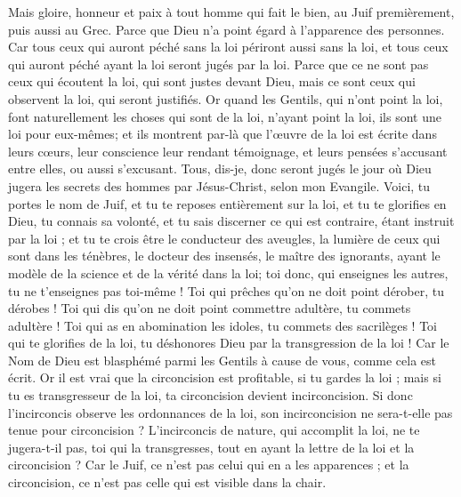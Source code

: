 \begin{multicols}{2}
Mais gloire, honneur et paix à tout homme qui fait le bien, au Juif premièrement, puis aussi au Grec.
Parce que Dieu n'a point égard à l'apparence des personnes.
Car tous ceux qui auront péché sans la loi périront aussi sans la loi, et tous ceux qui auront péché ayant la loi seront jugés par la loi.
Parce que ce ne sont pas ceux qui écoutent la loi, qui sont justes devant Dieu, mais ce sont ceux qui observent la loi, qui seront justifiés.
Or quand les Gentils, qui n'ont point la loi, font naturellement les choses qui sont de la loi, n'ayant point la loi, ils sont une loi pour eux-mêmes;
et ils montrent par-là que l'œuvre de la loi est écrite dans leurs cœurs, leur conscience leur rendant témoignage, et leurs pensées s'accusant entre elles, ou aussi s'excusant.
Tous, dis-je, donc seront jugés le jour où Dieu jugera les secrets des hommes par Jésus-Christ, selon mon Evangile.
Voici, tu portes le nom de Juif, et tu te reposes entièrement sur la loi, et tu te glorifies en Dieu,
tu connais sa volonté, et tu sais discerner ce qui est contraire, étant instruit par la loi ; 
et tu te crois être le conducteur des aveugles, la lumière de ceux qui sont dans les ténèbres,
le docteur des insensés, le maître des ignorants, ayant le modèle de la science et de la vérité dans la loi;
toi donc, qui enseignes les autres, tu ne t'enseignes pas toi-même ! Toi qui prêches qu'on ne doit point dérober, tu dérobes !
Toi qui dis qu'on ne doit point commettre adultère, tu commets adultère ! Toi qui as en abomination les idoles, tu commets des sacrilèges !
Toi qui te glorifies de la loi, tu déshonores Dieu par la transgression de la loi !
Car le Nom de Dieu est blasphémé parmi les Gentils à cause de vous, comme cela est écrit.
Or il est vrai que la circoncision est profitable, si tu gardes la loi ; mais si tu es transgresseur de la loi, ta circoncision devient incirconcision.
Si donc l'incirconcis observe les ordonnances de la loi, son incirconcision ne sera-t-elle pas tenue pour circoncision ?
L'incirconcis de nature, qui accomplit la loi, ne te jugera-t-il pas, toi qui la transgresses, tout en ayant la lettre de la loi et la circoncision ?
Car le Juif, ce n'est pas celui qui en a les apparences ; et la circoncision, ce n'est pas celle qui est visible dans la chair.

\end{multicols}
